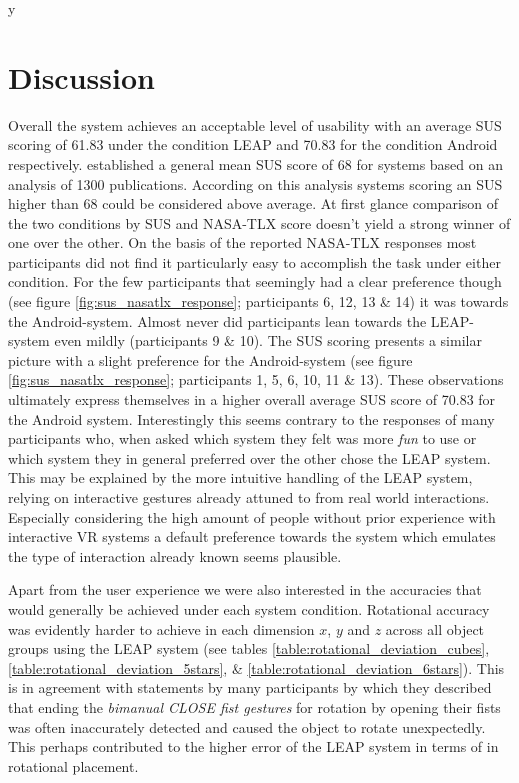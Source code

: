 y\section{Discussion}

Overall the system achieves an acceptable level of usability with an average SUS scoring of 61.83 under the condition LEAP and  70.83 for the condition Android respectively.
\cite{sus_gov} established a general mean SUS score of 68 for systems based on an analysis of 1300 publications.
According on this analysis systems scoring an SUS higher than 68 could be considered above average.
At first glance comparison of the two conditions by SUS and NASA-TLX score doesn't yield a strong winner of one over the other.
On the basis of the reported NASA-TLX responses most participants did not find it particularly easy to accomplish the task under either condition.
For the few participants that seemingly had a clear preference though (see figure \ref{fig:sus_nasatlx_response}; participants 6, 12, 13 \& 14) it was towards the Android-system.
Almost never did participants lean towards the LEAP-system even mildly (participants 9 \& 10).
The SUS scoring presents a similar picture with a slight preference for the Android-system (see figure \ref{fig:sus_nasatlx_response}; participants 1, 5, 6, 10, 11 \& 13).
These observations ultimately express themselves in a higher overall average SUS score of 70.83 for the Android system.
Interestingly this seems contrary to the responses of many participants who, when asked which system they felt was more \textit{fun} to use or which system they in general preferred over the other chose the LEAP system.
This may be explained by the more intuitive handling of the LEAP system, relying on interactive gestures already attuned to from real world interactions.
Especially considering the high amount of people without prior experience with interactive VR systems a default preference towards the system which emulates the type of interaction already known seems plausible.

Apart from the user experience we were also interested in the accuracies that would generally be achieved under each system condition.
Rotational accuracy was evidently harder to achieve in each dimension $x$, $y$ and $z$ across all object groups using the LEAP system (see tables \ref{table:rotational_deviation_cubes}, \ref{table:rotational_deviation_5stars}, \& \ref{table:rotational_deviation_6stars}).
This is in agreement with statements by many participants by which they described that ending the \textit{bimanual CLOSE fist gestures} for rotation by opening their fists was often inaccurately detected and caused the object to rotate unexpectedly.
This perhaps contributed to the higher error of the LEAP system in terms of in rotational placement.

